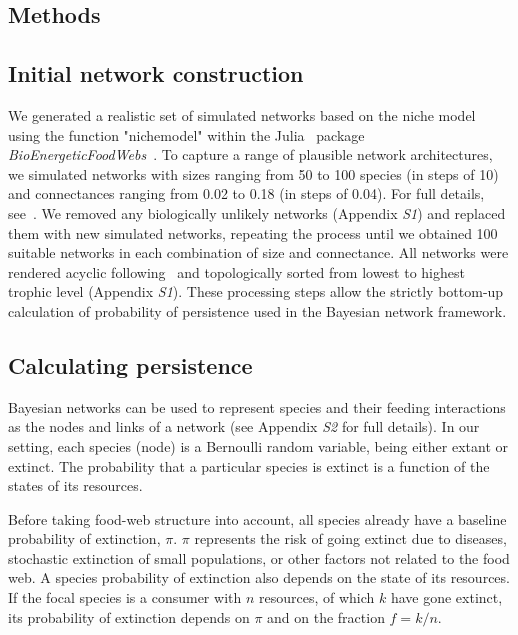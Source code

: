 \documentclass[12pt]{article}
\begin{document}
\begin{spacing}{2.0}
\section*{Methods}

	\subsection*{Initial network construction}

		We generated a realistic set of simulated networks based on the niche model~\citep{Williams2000,Stouffer2007} using the function "nichemodel" within the Julia~\citep{Bezanson2017julia} package \emph{BioEnergeticFoodWebs}~\citep{bioenergfw}. 
		To capture a range of plausible network architectures, we simulated networks with sizes ranging from 50 to 100 species (in steps of 10) and connectances ranging from 0.02 to 0.18 (in steps of 0.04). 
		For full details, see~\citet{Cirtwill2021_inprep}.
		We removed any biologically unlikely networks (Appendix \emph{S1}) and replaced them with new simulated networks, repeating the process until we obtained 100 suitable networks in each combination of size and connectance.
		All networks were rendered acyclic following~\citet{Allesina2009} and topologically sorted from lowest to highest trophic level (Appendix \emph{S1}).
		These processing steps allow the strictly bottom-up calculation of probability of persistence used in the Bayesian network framework.
		
		
	\subsection*{Calculating persistence}	
        Bayesian networks can be used to represent species and their feeding interactions as the nodes and links of a network (see Appendix \emph{S2} for full details).
        In our setting, each species (node) is a Bernoulli random variable, being either extant or extinct. 
        The probability that a particular species is extinct is a function of the states of its resources.
        
		Before taking food-web structure into account, all species already have a baseline probability of extinction, $\pi$. 
		$\pi$ represents the risk of going extinct due to diseases, stochastic extinction of small populations, or other factors not related to the food web.
		A species probability of extinction also depends on the state of its resources. 
        If the focal species is a consumer with $n$ resources, of which $k$ have gone extinct, its probability of extinction depends on $\pi$ and on the fraction $f = k/n$.
        

\end{spacing}
\end{document}
